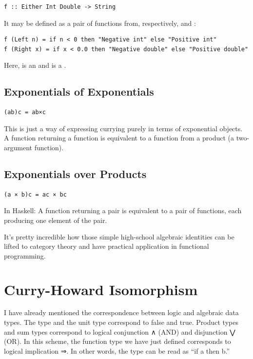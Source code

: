 \begin{verbatim}
f :: Either Int Double -> String
\end{verbatim}

It may be defined as a pair of functions from, respectively,
 and :

\begin{verbatim}
f (Left n) = if n < 0 then "Negative int" else "Positive int"
f (Right x) = if x < 0.0 then "Negative double" else "Positive double"
\end{verbatim}

Here,  is an  and  is a .

\subsection{Exponentials of
Exponentials}\label{exponentials-of-exponentials}

\begin{verbatim}
(ab)c = ab×c
\end{verbatim}

This is just a way of expressing currying purely in terms of exponential
objects. A function returning a function is equivalent to a function
from a product (a two-argument function).

\subsection{Exponentials over
Products}\label{exponentials-over-products}

\begin{verbatim}
(a × b)c = ac × bc
\end{verbatim}

In Haskell: A function returning a pair is equivalent to a pair of
functions, each producing one element of the pair.

It's pretty incredible how those simple high-school algebraic identities
can be lifted to category theory and have practical application in
functional programming.

\section{Curry-Howard Isomorphism}\label{curry-howard-isomorphism}

I have already mentioned the correspondence between logic and algebraic
data types. The  type and the unit type \code{()}
correspond to false and true. Product types and sum types correspond to
logical conjunction ∧ (AND) and disjunction ⋁ (OR). In this scheme, the
function type we have just defined corresponds to logical implication ⇒.
In other words, the type  can be read as ``if
a then b.''

